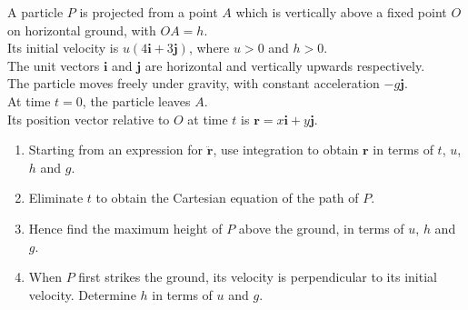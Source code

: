 \documentclass[leqno]{article}
\begin{document}
\begin{enumerate}[
  label=\textbf{\arabic*.},
  leftmargin=*,
  topsep=0pt,
  partopsep=0pt,
  parsep=0pt
]
\newpage

\questionitem

A particle $P$ is projected from a point $A$ which is vertically above a fixed point $O$ on horizontal ground, with $OA=h$. \\
Its initial velocity is $u(4\mathbf{i}+3\mathbf{j})$, where $u>0$ and $h>0$. \\
The unit vectors $\mathbf{i}$ and $\mathbf{j}$ are horizontal and vertically upwards respectively. \\
The particle moves freely under gravity, with constant acceleration $-g\mathbf{j}$. \\

At time $t=0$, the particle leaves $A$. \\
Its position vector relative to $O$ at time $t$ is $\mathbf{r}=x\mathbf{i}+y\mathbf{j}$. \\

\begin{enumerate}[label=\textbf{(\alph*)}]
\item Starting from an expression for $\ddot{\mathbf{r}}$, use integration to obtain $\mathbf{r}$ in terms of $t$, $u$, $h$ and $g$.  \\
\item Eliminate $t$ to obtain the Cartesian equation of the path of $P$.  \\
\item Hence find the maximum height of $P$ above the ground, in terms of $u$, $h$ and $g$.  \\
\item When $P$ first strikes the ground, its velocity is perpendicular to its initial velocity. Determine $h$ in terms of $u$ and $g$.  \\
\end{enumerate}

\newpage

\questionitem


\end{enumerate}
\end{document}
